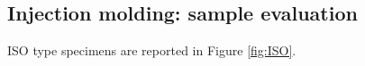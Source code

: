 \documentclass[a4paper, 11pt]{article}
\begin{document}
\subsection{Injection molding: sample evaluation}

ISO type specimens are reported in Figure \ref{fig:ISO}.

\begin{figure}[htp]
\centering
{} \qquad
{} \\
\subfloat[][]

\end{figure}
\end{document}
